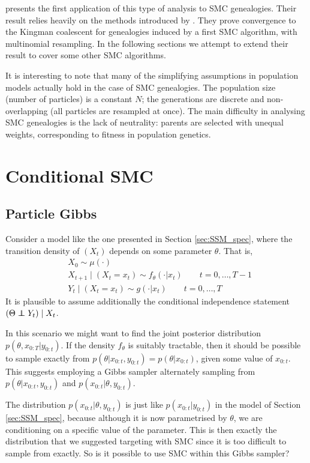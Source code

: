 \documentclass[fleqn]{article}
\theoremstyle{definition}
\newcommand\indep{\protect\mathpalette{\protect\independenT}{\perp}}
\def\independenT#1#2{\mathrel{\rlap{$#1#2$}\mkern2mu{#1#2}}}
\begin{document}
\citet{koskela2018} presents the first application of this type of analysis to SMC genealogies. Their result relies heavily on the methods introduced by \citet{mohle1998}.
They prove convergence to the Kingman coalescent for genealogies induced by a first SMC algorithm, with multinomial resampling.
In the following sections we attempt to extend their result to cover some other SMC algorithms.

It is interesting to note that many of the simplifying assumptions in population models actually hold in the case of SMC genealogies. The population size (number of particles) is a constant $N$; the generations are discrete and non-overlapping (all particles are resampled at once). The main difficulty in analysing SMC genealogies is the lack of neutrality: parents are selected with unequal weights, corresponding to fitness in population genetics.

\section{Conditional SMC}\label{sec:conditionalSMC}

\subsection{Particle Gibbs}
Consider a model like the one presented in Section \ref{sec:SSM_spec}, where the transition density of $(X_t)$ depends on some parameter $\theta$. That is,
\begin{align*}
& X_0 \sim \mu(\cdot) \\
& X_{t+1} \mid (X_t = x_t) \sim f_{\theta}(\cdot | x_t)  \qquad t=0,\dots,T-1 \\
& Y_t \mid (X_t = x_t) \sim g(\cdot | x_t) \qquad t=0,\dots,T
\end{align*}
It is plausible to assume additionally the conditional independence statement $(\Theta \indep Y_t) \mid X_t$.

In this scenario we might want to find the joint posterior distribution $p(\theta, x_{0:T} | y_{0:t})$.
If the density $f_\theta$ is suitably tractable, then it should be possible to sample exactly from $p(\theta | x_{0:t}, y_{0:t}) = p(\theta | x_{0:t})$, given some value of $x_{0:t}$.
This suggests employing a Gibbs sampler alternately sampling from $p(\theta | x_{0:t}, y_{0:t})$ and $p(x_{0:t} | \theta, y_{0:t})$.

The distribution $p(x_{0:t} | \theta, y_{0:t})$ is just like $p(x_{0:t} | y_{0:t})$ in the model of Section \ref{sec:SSM_spec}, because although it is now parametrised by $\theta$, we are conditioning on a specific value of the parameter.
This is then exactly the distribution that we suggested targeting with SMC since it is too difficult to sample from exactly.
So is it possible to use SMC within this Gibbs sampler?
\end{document}
